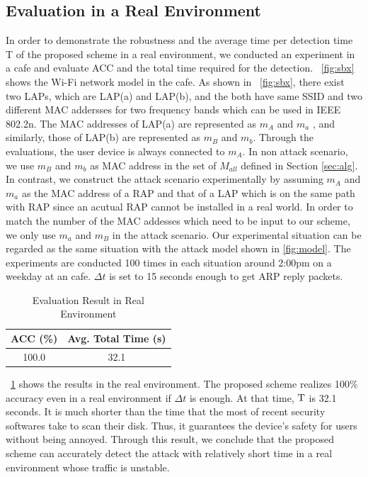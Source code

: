 \documentclass[conference]{IEEEtran}
\newcommand{\stba}{m_{a}}
\newcommand{\stbA}{m_{A}}
\newcommand{\stbb}{m_{b}}
\newcommand{\stbB}{m_{B}}
\begin{document}
\subsection{Evaluation in a Real Environment}
In order to demonstrate the robustness and the average time per detection time T of the proposed scheme in a real environment, we conducted an experiment in a cafe and evaluate ACC and the total time required for the detection.
\figurename~\ref{fig:sbx} shows the Wi-Fi network model in the cafe.
As shown in \figurename~\ref{fig:sbx}, there exist two LAPs, which are LAP(a) and LAP(b), and the both have same SSID and two different MAC addersses for two frequency bands which can be used in IEEE 802.2n.
The MAC addresses of LAP(a) are represented as $\stbA$ and $\stba$ , and similarly, those of LAP(b) are represented as $\stbB$ and $\stbb$.
Through the evaluations, the user device is always connected to $\stbA$.
In non attack scenario, we use $\stbB$ and $\stbb$ as MAC address in the set of $M_{all}$ defined in Section \ref{sec:alg}.
In contrast, we construct the attack scenario experimentally by assuming $\stbA$ and $\stba$ as the MAC address of a RAP and that of a LAP which is on the same path with RAP since an acutual RAP cannot be installed in a real world.
In order to match the number of the MAC addesses which need to be input to our scheme, we only use $\stba$ and $\stbB$ in the attack scenario.
Our experimental situation can be regarded as the same situation with the attack model shown in \ref{fig:model}.
The experiments are conducted 100 times in each situation around 2:00pm on a weekday at an cafe.
$\Delta t$ is set to 15 seconds enough to get ARP reply packets.
\begin{table}[t] 
    \begin{center}
        \caption{Evaluation Result in Real Environment}
        \label{tab:real}
        \begin{tabular}{c c} \hline
            ACC (\%) & Avg. Total Time (s) \\ \hline \hline
            100.0 & 32.1 \\ \hline
        \end{tabular}
    \end{center}
    \vspace{-2zh}
\end{table}

\tablename~\ref{tab:real} shows the results in the real environment.
The proposed scheme realizes 100\% accuracy even in a real environment if $\Delta t$ is enough.
At that time, $\rm T$ is 32.1 seconds.
It is much shorter than the time that the most of recent security softwares take to scan their disk.
Thus, it guarantees the device's safety for users without being annoyed.
Through this result, we conclude that the proposed scheme can accurately detect the attack with relatively short time in a real environment whose traffic is unstable.
\end{document}
